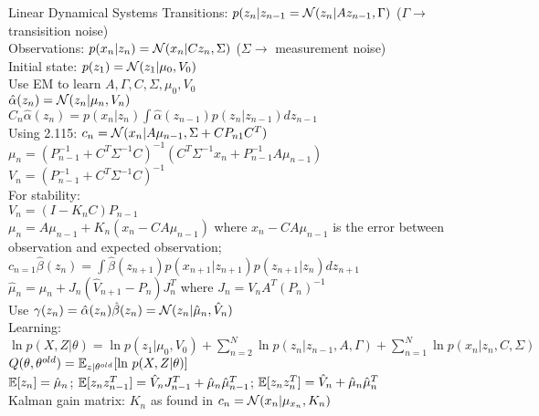 \documentclass[a4paper,landscape]{amsmlaj}
\makeatletter
\renewcommand{\subsection}{\@startsection{subsection}{2}{0mm}
	{-1ex plus -.5ex minus -.2ex}
	{0.1ex plus .2ex}
	{\normalfont\normalsize\bfseries}}
\makeatother
\begin{document}
\begin{multicols*}{3}
\subsection{Linear Dynamical Systems}
Transitions:
$p(z_n|z_{n-1} = \mathcal{N}(z_n|Az_{n-1}, \Gamma)$ ($\Gamma \to$ transisition noise) \\
Observations:
$p(x_n|z_n) = \mathcal{N}(x_n|Cz_n, \Sigma)$ ($\Sigma \to$ measurement noise) \\
Initial state: $p(z_1) = \mathcal{N}(z_1|\mu_0, V_0)$ \\
Use EM to learn $A, \Gamma, C, \Sigma, \mu_0, V_0$ \\
$\hat\alpha(z_n) = \mathcal{N}(z_n|\mu_n, V_n)$ \\
$C_n\hat\alpha(z_n) = p(x_n|z_n)\int\hat\alpha(z_{n-1})p(z_n|z_{n-1})dz_{n-1}$ \\
Using 2.115:
$c_n = \mathcal{N}(x_n|A\mu_{n-1},\Sigma+CP_{n1}C^T)$ \\
$\mu_n = (P_{n-1}^{-1} + C^T\Sigma^{-1}C)^{-1} (C^T\Sigma^{-1}x_n + P_{n-1}^{-1}A\mu_{n-1})$ \\
$V_n = (P_{n-1}^{-1} + C^T\Sigma^{-1}C)^{-1}$ \\
For stability: \\
$V_n = (I-K_nC)P_{n-1}$ \\
$\mu_n = A\mu_{n-1} + K_n(x_n - CA\mu_{n-1})$
	where $x_n-CA\mu_{n-1}$ is the error between observation and expected observation; \\
$c_{n=1}\hat\beta(z_n) = \int \hat\beta(z_{n+1})p(x_{n+1}|z_{n+1}) p(z_{n+1}|z_n) dz_{n+1}$ \\
$\hat\mu_n = \mu_n + J_n(\hat V_{n+1} - P_n)J_n^T$
	where $J_n = V_nA^T(P_n)^{-1}$ \\
Use $\gamma(z_n) = \hat\alpha(z_n)\hat\beta(z_n) = \mathcal{N}(z_n|\hat\mu_n, \hat V_n)$ \\
Learning:
$\ln p(X,Z|\theta)
	= \ln p(z_1|\mu_0, V_0)
		+ \sum^N_{n=2} \ln p(z_n|z_{n-1}, A, \Gamma)
		+ \sum^N_{n=1} \ln p(x_n|z_n, C, \Sigma)$ \\
$Q(\theta, \theta^{old}) = \mathbb{E}_{z|\theta^{old}}[\text{ln } p(X,Z|\theta)]$ \\
$\mathbb{E}[z_n] = \hat\mu_n$; $\mathbb{E}[z_nz_{n-1}^T] = \hat V_nJ_{n-1}^T+\hat\mu_n\hat\mu_{n-1}^T$;
$\mathbb{E}[z_nz_n^T]= \hat V_n + \hat\mu_n\hat\mu_n^T$\\
Kalman gain matrix: $K_n$ as found in $c_n = \mathcal{N}(x_n|\mu_{x_n}, K_n)$



\end{multicols*}
\end{document}
